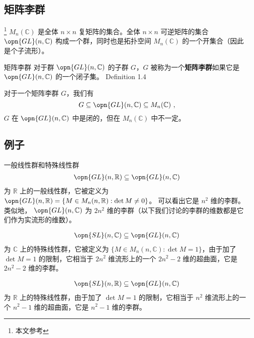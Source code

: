 
\begin{issues}
\issueDraft
\end{issues}


\subsection{矩阵李群}

\footnote{本文参考\cite{GTM222}} $M_n(\mathbb{C})$ 是全体 $n \times n$ 复矩阵的集合。全体 $n \times n$ 可逆矩阵的集合 $\opn{GL}(n, \mathbb{C})$ 构成一个群，同时也是拓扑空间 $M_n(\mathbb{C})$ 的一个开集合（因此是个子流形）。

\begin{definition}{矩阵李群}
对于群 $\opn{GL}(n, \mathbb{C})$ 的子群 $G$，$G$ 被称为一个\textbf{矩阵李群}如果它是 $\opn{GL}(n, \mathbb{C})$ 的一个闭子集。 Definition 1.4 \cite{GTM222} 
\end{definition}

对于一个矩阵李群 $G$，我们有
$$
G \subseteq \opn{GL}(n, \mathbb{C}) \subseteq M_n(\mathbb{C})~,
$$
$G$ 在 $\opn{GL}(n, \mathbb{C})$ 中是闭的，但在 $M_n(\mathbb{C})$ 中不一定。

\subsection{例子}

\begin{example}{一般线性群和特殊线性群}
\begin{equation}
\begin{aligned}
\opn{GL}(n, \mathbb{R}) \subseteq \opn{GL}(n, \mathbb{C})
\end{aligned}
\end{equation}
为 $\mathbb R$ 上的一般线性群，它被定义为 $\opn{GL}(n,\mathbb R)=\{M\in M_n(n,\mathbb{R}): \det M\neq 0 \}$。
可以看出它是 $n^2$ 维的李群。类似地， ${\opn{GL}(n,\mathbb{C})}$ 为 $2n^2$ 维的李群（以下我们讨论的李群的维数都是它们作为实流形的维数）。

\begin{equation}
\begin{aligned}
\opn{SL}(n, \mathbb{C}) \subseteq \opn{GL}(n, \mathbb{C})
\end{aligned}
\end{equation}
为 $\mathbb C$ 上的特殊线性群，它被定义为 $\{M\in M_n(n,\mathbb{C}): \det M=1 \}$，由于加了 $\det M=1$ 的限制，它相当于 $2n^2$ 维流形上的一个 $2n^2-2$ 维的超曲面，它是 $2n^2-2$ 维的李群。

\begin{equation}
\begin{aligned}
\opn{SL}(n, \mathbb{R}) \subseteq \opn{GL}(n, \mathbb{C})
\end{aligned}
\end{equation}
为 $\mathbb R$ 上的特殊线性群，由于加了 $\det M=1$ 的限制，它相当于 $n^2$ 维流形上的一个 $n^2-1$ 维的超曲面，它是 $n^2-1$ 维的李群。
\end{example}

